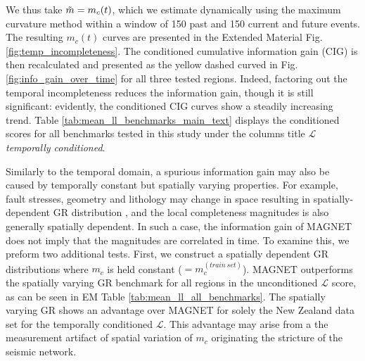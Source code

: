\documentclass[pdflatex]{sn-jnl}
\begin{document}
We thus take $\Tilde{m}=m_c(t)$, which we estimate dynamically using the maximum curvature method \cite{wiemer_minimum_2000} within a window of 150 past and 150 current and future events. The resulting $m_c(t)$ curves are presented in the Extended Material Fig. \ref{fig:temp_incompleteness}. The conditioned cumulative information gain (CIG) is then recalculated and presented as the yellow dashed curved in Fig.  \ref{fig:info_gain_over_time} for all three tested regions. 
Indeed, factoring out the temporal incompleteness reduces the information gain, though it is still significant: evidently, the conditioned CIG curves show a steadily increasing trend. Table \ref{tab:mean_ll_benchmarks_main_text} displays the conditioned scores for all benchmarks tested in this study under the columns title \textit{$\mathcal{L}$ temporally conditioned}.

Similarly to the temporal domain, a spurious information gain may also be caused by temporally constant but spatially varying properties. For example, fault stresses, geometry and lithology may change in space resulting in spatially-dependent GR distribution \cite{amitrano_brittle-ductile_2003, scholz_stress_2015, herrmann_revealing_2022, taroni_earthquake_2023}, and the local completeness magnitudes is also generally spatially dependent. In such a case, the information gain of MAGNET does not imply that the magnitudes are correlated in time. 
To examine this, we preform two additional tests. First, we construct a spatially dependent GR distributions where $m_c$ is held constant ($=m_c^(train\ set)$). MAGNET outperforms the spatially varying GR benchmark for all regions in the unconditioned $\mathcal{L}$ score, as can be seen in EM Table \ref{tab:mean_ll_all_benchmarks}. The spatially varying GR shows an advantage over MAGNET for solely the New Zealand data set for the temporally conditioned $\mathcal{L}$. This advantage may arise from a the measurement artifact of spatial variation of $m_c$ originating the stricture of the seismic network.
\end{document}
